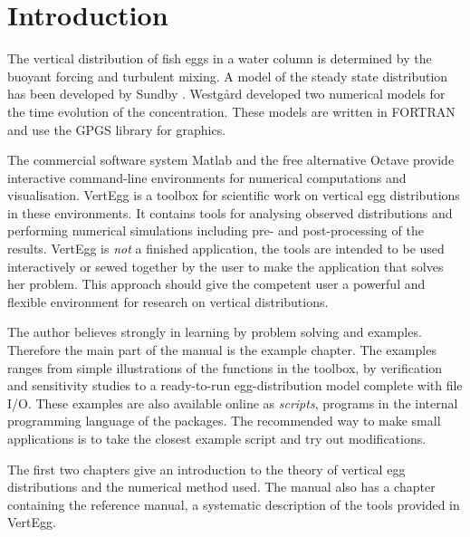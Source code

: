 
\chapter*{Introduction}

The vertical distribution of fish eggs in a water column is determined
by the buoyant forcing and turbulent mixing.  A model of the steady
state distribution has been developed by Sundby .
Westg{\aa}rd  developed two numerical models for the time
evolution of the concentration. These models are written in FORTRAN
and use the GPGS library for graphics.

The commercial software system Matlab and the free alternative Octave
provide interactive command-line environments for numerical computations
and visualisation.  VertEgg is a toolbox for scientific work on
vertical egg distributions in these environments. It contains tools for
analysing observed distributions and performing numerical simulations
including pre- and post-processing of the results. VertEgg is
\emph{not} a finished application, the tools are intended to be used
interactively or sewed together by the user to make the application
that solves her problem. This approach should give the competent user a
powerful and flexible environment for research on vertical distributions.

The author believes strongly in learning by problem solving and
examples. Therefore the main part of the manual is the example chapter.
The examples ranges from simple illustrations of the functions in the
toolbox, by verification and sensitivity studies to a ready-to-run
egg-distribution model complete with file I/O.
These examples are also available online as \emph{scripts}, programs in
the internal programming language of the packages. The recommended way
to make small applications is to take the closest example script and
try out modifications.

The first two chapters give an introduction to the theory of vertical
egg distributions and the numerical method used. The manual also has a
chapter containing the reference manual, a systematic description of the
tools provided in VertEgg.


